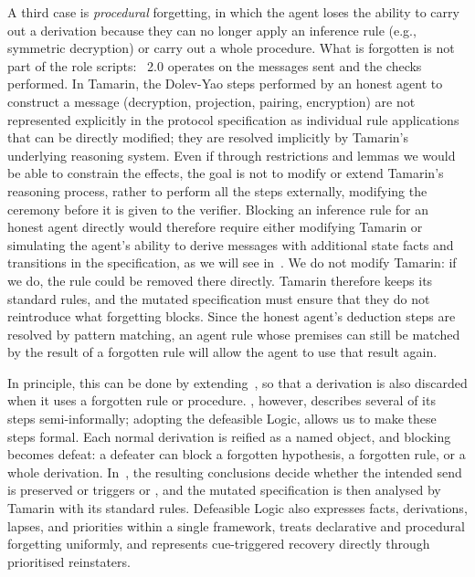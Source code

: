 A third case is \emph{procedural} forgetting, in which the agent loses the ability to carry out a derivation because they can no longer apply an inference rule (e.g., symmetric decryption) or carry out a whole procedure. What is forgotten is not part of the role scripts: \XMen~2.0 operates on the messages sent and the checks performed. In Tamarin, the Dolev-Yao steps performed by an honest agent to construct a message (decryption, projection, pairing, encryption) are not represented explicitly in the protocol specification as individual rule applications that can be directly modified; they are resolved implicitly by Tamarin's underlying reasoning system. Even if through restrictions and lemmas  we would be able to constrain the effects, the goal is not to modify or extend Tamarin's reasoning process, rather to perform all the steps externally, modifying the ceremony before it is given to the verifier. Blocking an inference rule for an honest agent directly would therefore require either modifying Tamarin or simulating the agent's ability to derive messages with additional state facts and transitions in the specification, as we will see in~. We do not modify Tamarin: if we do, the rule could be removed there directly. Tamarin therefore keeps its standard rules, and the mutated specification must ensure that they do not reintroduce what forgetting blocks. Since the honest agent's deduction steps are resolved by pattern matching, an agent rule whose premises can still be matched by the result of a forgotten rule will allow the agent to use that result again.

In principle, this can be done by extending~, so that a derivation is also discarded when it uses a forgotten rule or procedure. , however, describes several of its steps semi-informally;
adopting the defeasible Logic, allows us to make these steps formal. Each normal derivation is reified as a named object, and blocking becomes defeat: a defeater can block a forgotten hypothesis, a forgotten rule, or a whole derivation. In~, the resulting conclusions decide whether the intended send is preserved or triggers \replace{} or \skipmutation{}, and the mutated specification is then analysed by Tamarin with its standard rules. Defeasible Logic also expresses facts, derivations, lapses, and priorities within a single framework, treats declarative and procedural forgetting uniformly, and represents cue-triggered recovery directly through prioritised reinstaters.


